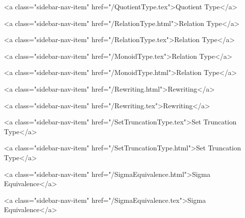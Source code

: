       
        
          <a class="sidebar-nav-item" href="/QuotientType.tex">Quotient Type</a>
        
      
    
      
        
          <a class="sidebar-nav-item" href="/RelationType.html">Relation Type</a>
        
      
    
      
        
          <a class="sidebar-nav-item" href="/RelationType.tex">Relation Type</a>
        
      
    
      
        
          <a class="sidebar-nav-item" href="/MonoidType.tex">Relation Type</a>
        
      
    
      
        
          <a class="sidebar-nav-item" href="/MonoidType.html">Relation Type</a>
        
      
    
      
        
          <a class="sidebar-nav-item" href="/Rewriting.html">Rewriting</a>
        
      
    
      
        
          <a class="sidebar-nav-item" href="/Rewriting.tex">Rewriting</a>
        
      
    
      
        
          <a class="sidebar-nav-item" href="/SetTruncationType.tex">Set Truncation Type</a>
        
      
    
      
        
          <a class="sidebar-nav-item" href="/SetTruncationType.html">Set Truncation Type</a>
        
      
    
      
        
          <a class="sidebar-nav-item" href="/SigmaEquivalence.html">Sigma Equivalence</a>
        
      
    
      
        
          <a class="sidebar-nav-item" href="/SigmaEquivalence.tex">Sigma Equivalence</a>
        
      
    
